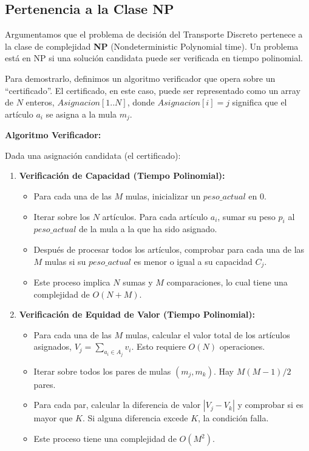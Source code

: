 \documentclass[12pt, a4paper]{article}
\begin{document}
    \subsection{Pertenencia a la Clase NP}
    Argumentamos que el problema de decisión del Transporte Discreto pertenece a la clase de complejidad \textbf{NP} (Nondeterministic Polynomial time). Un problema está en NP si una solución candidata puede ser verificada en tiempo polinomial.

    Para demostrarlo, definimos un algoritmo verificador que opera sobre un ``certificado''. El certificado, en este caso, puede ser representado como un array de $N$ enteros, $Asignacion[1..N]$, donde $Asignacion[i] = j$ significa que el artículo $a_i$ se asigna a la mula $m_j$.

    \textbf{Algoritmo Verificador:}

    Dada una asignación candidata (el certificado):
    \begin{enumerate}
        \item \textbf{Verificación de Capacidad (Tiempo Polinomial):}
        \begin{itemize}
            \item Para cada una de las $M$ mulas, inicializar un $peso\_actual$ en 0.
            \item Iterar sobre los $N$ artículos. Para cada artículo $a_i$, sumar su peso $p_i$ al $peso\_actual$ de la mula a la que ha sido asignado.
            \item Después de procesar todos los artículos, comprobar para cada una de las $M$ mulas si su $peso\_actual$ es menor o igual a su capacidad $C_j$.
            \item Este proceso implica $N$ sumas y $M$ comparaciones, lo cual tiene una complejidad de $O(N + M)$.
        \end{itemize}

        \item \textbf{Verificación de Equidad de Valor (Tiempo Polinomial):}
        \begin{itemize}
            \item Para cada una de las $M$ mulas, calcular el valor total de los artículos asignados, $V_j = \sum_{a_i \in A_j} v_i$. Esto requiere $O(N)$ operaciones.
            \item Iterar sobre todos los pares de mulas $(m_j, m_k)$. Hay $M(M-1)/2$ pares.
            \item Para cada par, calcular la diferencia de valor $|V_j - V_k|$ y comprobar si es mayor que $K$. Si alguna diferencia excede $K$, la condición falla.
            \item Este proceso tiene una complejidad de $O(M^2)$.
        \end{itemize}
    \end{enumerate}
\end{document}
